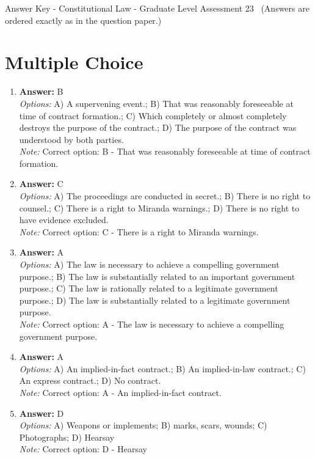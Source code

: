 \documentclass[12pt]{article}
\begin{document}
\begin{center}
Answer Key - Constitutional Law - Graduate Level Assessment 23 \
\small (Answers are ordered exactly as in the question paper.)
\end{center}

\section*{Multiple Choice}
\begin{enumerate}[label=\arabic*.]
\item \textbf{Answer:} B
\\ \textit{Options:} A) A supervening event.; B) That was reasonably foreseeable at time of contract formation.; C) Which completely or almost completely destroys the purpose of the contract.; D) The purpose of the contract was understood by both parties.
\\ \textit{Note:} Correct option: B - That was reasonably foreseeable at time of contract formation.
\item \textbf{Answer:} C
\\ \textit{Options:} A) The proceedings are conducted in secret.; B) There is no right to counsel.; C) There is a right to Miranda warnings.; D) There is no right to have evidence excluded.
\\ \textit{Note:} Correct option: C - There is a right to Miranda warnings.
\item \textbf{Answer:} A
\\ \textit{Options:} A) The law is necessary to achieve a compelling government purpose.; B) The law is substantially related to an important government purpose.; C) The law is rationally related to a legitimate government purpose.; D) The law is substantially related to a legitimate government purpose.
\\ \textit{Note:} Correct option: A - The law is necessary to achieve a compelling government purpose.
\item \textbf{Answer:} A
\\ \textit{Options:} A) An implied-in-fact contract.; B) An implied-in-law contract.; C) An express contract.; D) No contract.
\\ \textit{Note:} Correct option: A - An implied-in-fact contract.
\item \textbf{Answer:} D
\\ \textit{Options:} A) Weapons or implements; B) marks, scars, wounds; C) Photographs; D) Hearsay
\\ \textit{Note:} Correct option: D - Hearsay
\end{enumerate}
\end{document}
